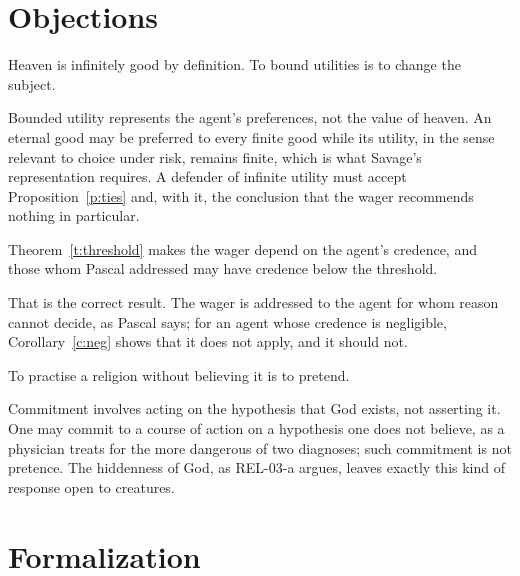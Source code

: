 \documentclass{situationist-preprint}
\begin{document}
\section{Objections}

\begin{objection}
Heaven is infinitely good by definition. To bound utilities is to change the subject.
\end{objection}

\begin{reply}
Bounded utility represents the agent's preferences, not the value of heaven. An eternal good may be preferred to every finite good while its utility, in the sense relevant to choice under risk, remains finite, which is what Savage's representation requires. A defender of infinite utility must accept Proposition~\ref{p:ties} and, with it, the conclusion that the wager recommends nothing in particular.
\end{reply}

\begin{objection}
Theorem~\ref{t:threshold} makes the wager depend on the agent's credence, and those whom Pascal addressed may have credence below the threshold.
\end{objection}

\begin{reply}
That is the correct result. The wager is addressed to the agent for whom reason cannot decide, as Pascal says; for an agent whose credence is negligible, Corollary~\ref{c:neg} shows that it does not apply, and it should not.
\end{reply}

\begin{objection}
To practise a religion without believing it is to pretend.
\end{objection}

\begin{reply}
Commitment involves acting on the hypothesis that God exists, not asserting it. One may commit to a course of action on a hypothesis one does not believe, as a physician treats for the more dangerous of two diagnoses; such commitment is not pretence. The hiddenness of God, as REL-03-a argues, leaves exactly this kind of response open to creatures.
\end{reply}

\section{Formalization}
\end{document}

